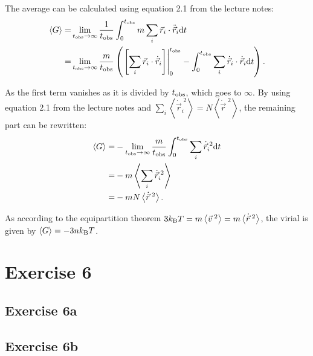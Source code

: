 \documentclass[titlepage]{report}
\begin{document}
The average can be calculated using equation 2.1 from the lecture notes:
\begin{subequations}
	\begin{align}
	\langle G \rangle =& \lim\limits_{t_{\rm{obs}} \rightarrow \infty} \frac{1}{t_{\rm{obs}}} \int_{0}^{t_{\rm{obs}}} m \sum_i \vec{r}_i \cdot \ddot{\vec{r}}_i \mathrm{d} t\\
	=& \lim\limits_{t_{\rm{obs}} \rightarrow \infty} \frac{m}{t_{\rm{obs}}} \left( \left. \left[\sum_i \vec{r}_i \cdot \dot{\vec{r}}_i \right] \right|_0^{t_{\rm{obs}}} - \int_{0}^{t_{\rm{obs}}} \sum_i \dot{\vec{r}}_i \cdot \dot{\vec{r}}_i \mathrm{d} t \right).
	\end{align}
\end{subequations}

As the first term vanishes as it is divided by $ t_{\rm{obs}} $, which goes to $ \infty $. By using equation 2.1 from the lecture notes and $ \sum_i \left\langle \dot{\vec{r}}_i^{\;2} \right\rangle = N \left\langle \dot{\vec{r}}^{\;2} \right\rangle $, the remaining part can be rewritten:
\begin{subequations}
	\begin{align}
	\langle G \rangle =& - \lim\limits_{t_{\rm{obs}} \rightarrow \infty} \frac{m}{t_{\rm{obs}}} \int_{0}^{t_{\rm{obs}}} \sum_i \dot{\vec{r}}_i^{\;2} \mathrm{d} t \\
	=& -m \left\langle \sum_i \dot{\vec{r}}_i^{\;2} \right\rangle\\
	=& -m N \left\langle \dot{\vec{r}}^{\;2} \right\rangle.
	\end{align}
\end{subequations}

As according to the equipartition theorem $ 3 k_{\rm{B}} T = m \left\langle \vec{v}^{\;2} \right\rangle = m \left\langle \dot{\vec{r}}^{\;2} \right\rangle $, the virial is given by $ \langle G \rangle = -3 n k_{\rm{B}} T $.


\section{Exercise 6}
\subsection{Exercise 6a}

\subsection{Exercise 6b}
\end{document}
